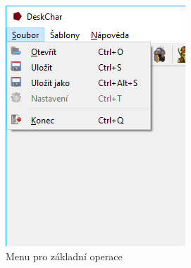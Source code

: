 \documentclass[12pt,a4paper,oneside]{article}
\begin{document}
	\begin{figure}[h]
  		\centering
  		\begin{minipage}[t]{0.48\textwidth}
    		\includegraphics[width=\linewidth]{images/menu_soubor.png}
    		\caption{Menu pro základní operace}
    		\label{fig:menu_soubor}
  		\end{minipage}
  		\hfill
  		\begin{minipage}[t]{0.48\textwidth}

\end{minipage}
\end{figure}
\end{document}
